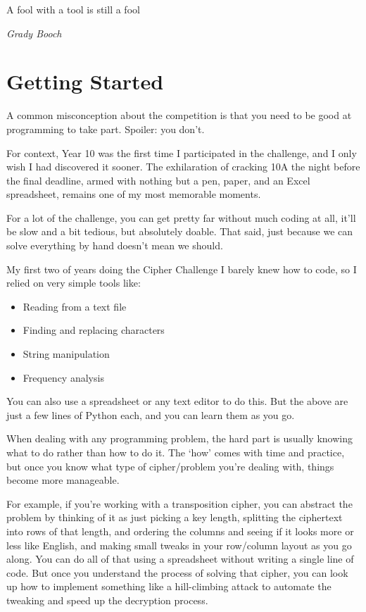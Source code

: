 \epigraph{A fool with a tool is still a fool}
{\textit{Grady Booch}}



\section{Getting Started}

A common misconception about the competition is that you need to be good at programming to take part. Spoiler: you don't.  

For context, Year 10 was the first time I participated in the challenge, and I only wish I had discovered it sooner. The exhilaration of cracking 10A the night before the final deadline, armed with nothing but a pen, paper, and an Excel spreadsheet, remains one of my most memorable moments. 

For a lot of the challenge, you can get pretty far without much coding at all, it’ll be slow and a bit tedious, but absolutely doable. That said, just because we can solve everything by hand doesn’t mean we should.

My first two of years doing the Cipher Challenge I barely knew how to code, so I relied on very simple tools like:
\begin{itemize}
    \item Reading from a text file
    \item Finding and replacing characters
    \item String manipulation
    \item Frequency analysis
\end{itemize}

You can also use a spreadsheet or any text editor to do this. But the above are just a few lines of Python each, and you can learn them as you go.

When dealing with any programming problem, the hard part is usually knowing what to do rather than how to do it. The `how' comes with time and practice, but once you know what type of cipher/problem you’re dealing with, things become more manageable.

For example, if you’re working with a transposition cipher, you can abstract the problem by thinking of it as just picking a key length, splitting the ciphertext into rows of that length, and ordering the columns and seeing if it looks more or less like English, and making small tweaks in your row/column layout as you go along. You can do all of that using a spreadsheet without writing a single line of code. But once you understand the process of solving that cipher, you can look up how to implement something like a hill-climbing attack to automate the tweaking and speed up the decryption process. 

